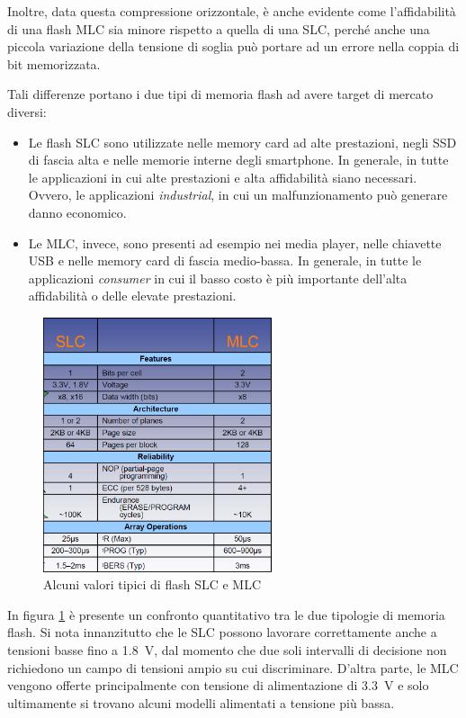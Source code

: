 \documentclass[11pt,4paper]{report}
\begin{document}
Inoltre, data questa compressione orizzontale, è anche evidente come l'affidabilità di una flash MLC sia minore rispetto a quella di una SLC, perché anche una piccola variazione della tensione di soglia può portare ad un errore nella coppia di bit memorizzata.

Tali differenze portano i due tipi di memoria flash ad avere target di mercato diversi:
\begin{itemize}
	\item Le flash SLC sono utilizzate nelle memory card ad alte prestazioni, negli SSD di fascia alta e nelle memorie interne degli smartphone. In generale, in tutte le applicazioni in cui alte prestazioni e alta affidabilità siano necessari. Ovvero, le applicazioni \emph{industrial}, in cui un malfunzionamento può generare danno economico.
	\item Le MLC, invece, sono presenti ad esempio nei media player, nelle chiavette USB e nelle memory card di fascia medio-bassa. In generale, in tutte le applicazioni \emph{consumer} in cui il basso costo è più importante dell'alta affidabilità o delle elevate prestazioni.
\end{itemize}

\begin{figure}[hbtp]
	\centering
	\includegraphics[width=0.6\textwidth]{memorie/jc_slc_mlc_numeri}
	\caption{Alcuni valori tipici di flash SLC e MLC}
	\label{fig:jc_slc_mlc_numeri}
\end{figure}

In figura \ref{fig:jc_slc_mlc_numeri} è presente un confronto quantitativo tra le due tipologie di memoria flash. Si nota innanzitutto che le SLC possono lavorare correttamente anche a tensioni basse fino a \SI{1.8}{\volt}, dal momento che due soli intervalli di decisione non richiedono un campo di tensioni ampio su cui discriminare. D'altra parte, le MLC vengono offerte principalmente con tensione di alimentazione di \SI{3.3}{\volt} e solo ultimamente si trovano alcuni modelli alimentati a tensione più bassa.
\end{document}
